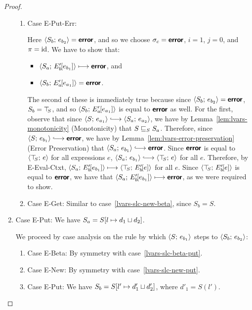 \begin{proof}
\begin{enumerate}
\begin{enumerate}
    \item \label{lvars-slc-new-put-err}Case {\sc E-Put-Err}:

      Here $\langle S_b;\, e_{b_2} \rangle = \textbf{\textsf{error}}$, and so we choose $\sigma_c
      = \textbf{\textsf{error}}$, $i = 1$, $j = 0$, and $\pi = \mathrm{id}$.  We have to show
      that:
      \begin{itemize}
      \item $\langle S_a;\, E'_b\hspace{-1mm}\left[e_{b_1}\right] \rangle \longmapsto
        \textbf{\textsf{error}}$, and
      \item
        $\langle S_b;\, E'_a\hspace{-1mm}\left[e_{a_1}\right] \rangle = \textbf{\textsf{error}}$.
      \end{itemize}

      The second of these is immediately true because since
      $\langle S_b;\, e_{b_2} \rangle = \textbf{\textsf{error}}$, $S_b = \top\hspace{-0.85mm}_{S}$, and so
      $\langle S_b;\, E'_a\hspace{-1mm}\left[e_{a_1}\right] \rangle$ is equal to $\textbf{\textsf{error}}$ as
      well.  For the first, observe that since $\config{S}{e_{a_1}}
      \parstepsto \config{S_a}{e_{a_2}}$, we have by
      Lemma~\ref{lem:lvars-monotonicity} (Monotonicity) that
      $S \sqsubseteq_S S_a$.  Therefore, since $\config{S}{e_{b_1}}
      \parstepsto \error$, we have by
      Lemma~\ref{lem:lvars-error-preservation} (Error Preservation)
      that $\config{S_a}{e_{b_1}} \parstepsto \error$.  Since $\textbf{\textsf{error}}$
      is equal to $\langle \top\hspace{-0.85mm}_{S};\, e \rangle$ for all expressions $e$,
      $\config{S_a}{e_{b_1}} \parstepsto \config{\topS}{e}$ for all
      $e$.  Therefore, by {\sc E-Eval-Ctxt},
      $\langle S_a;\, E'_b\hspace{-1mm}\left[e_{b_1}\right] \rangle \longmapsto
      \langle \top\hspace{-0.85mm}_{S};\, E'_b\hspace{-1mm}\left[e\right] \rangle$ for all $e$.  Since
      $\langle \top\hspace{-0.85mm}_{S};\, E'_b\hspace{-1mm}\left[e\right] \rangle$ is equal to $\textbf{\textsf{error}}$, we
      have that $\langle S_a;\, E'_b\hspace{-1mm}\left[e_{b_1}\right] \rangle \longmapsto
      \textbf{\textsf{error}}$, as we were required to show.

    \item \label{lvars-slc-new-get}Case {\sc E-Get}: Similar to
      case~\ref{lvars-slc-new-beta}, since $S_b = S$.
    \end{enumerate}
  \item Case {\sc E-Put}: We have $S_a =
    S[l \mapsto d_1 \sqcup d_2]$.

    We proceed by case analysis on the rule by which
    $\langle S;\, e_{b_1} \rangle$ steps to $\langle S_b;\, e_{b_2} \rangle$:
    \begin{enumerate}
    \item \label{lvars-slc-put-beta}Case {\sc E-Beta}: By symmetry with case~\ref{lvars-slc-beta-put}.
    \item \label{lvars-slc-put-new}Case {\sc E-New}: By symmetry with case~\ref{lvars-slc-new-put}.
    \item \label{lvars-slc-put-put}Case {\sc E-Put}: We have $S_b =
      S[l' \mapsto d'_1 \sqcup d'_2]$, where $d'_1 = S(l')$.


\end{enumerate}
\end{enumerate}
\end{proof}
